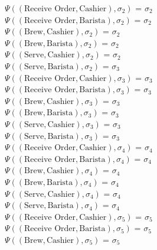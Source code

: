\documentclass[a4paper]{article}
\begin{document}
$\Psi((\text{Receive Order},\text{Cashier}),\sigma_2)$ = $\sigma_2$ \\[0.1\baselineskip] 
$\Psi((\text{Receive Order},\text{Barista}),\sigma_2)$ = $\sigma_2$ \\[0.1\baselineskip] 
$\Psi((\text{Brew},\text{Cashier}),\sigma_2)$ = $\sigma_2$ \\[0.1\baselineskip] 
$\Psi((\text{Brew},\text{Barista}),\sigma_2)$ = $\sigma_2$ \\[0.1\baselineskip] 
$\Psi((\text{Serve},\text{Cashier}),\sigma_2)$ = $\sigma_2$ \\[0.1\baselineskip] 
$\Psi((\text{Serve},\text{Barista}),\sigma_2)$ = $\sigma_3$ \\[0.7\baselineskip] 
$\Psi((\text{Receive Order},\text{Cashier}),\sigma_3)$ = $\sigma_3$ \\[0.1\baselineskip] 
$\Psi((\text{Receive Order},\text{Barista}),\sigma_3)$ = $\sigma_3$ \\[0.1\baselineskip] 
$\Psi((\text{Brew},\text{Cashier}),\sigma_3)$ = $\sigma_3$ \\[0.1\baselineskip] 
$\Psi((\text{Brew},\text{Barista}),\sigma_3)$ = $\sigma_3$ \\[0.1\baselineskip] 
$\Psi((\text{Serve},\text{Cashier}),\sigma_3)$ = $\sigma_3$ \\[0.1\baselineskip] 
$\Psi((\text{Serve},\text{Barista}),\sigma_3)$ = $\sigma_3$ \\[0.7\baselineskip] 
$\Psi((\text{Receive Order},\text{Cashier}),\sigma_4)$ = $\sigma_4$ \\[0.1\baselineskip] 
$\Psi((\text{Receive Order},\text{Barista}),\sigma_4)$ = $\sigma_4$ \\[0.1\baselineskip] 
$\Psi((\text{Brew},\text{Cashier}),\sigma_4)$ = $\sigma_4$ \\[0.1\baselineskip] 
$\Psi((\text{Brew},\text{Barista}),\sigma_4)$ = $\sigma_4$ \\[0.1\baselineskip] 
$\Psi((\text{Serve},\text{Cashier}),\sigma_4)$ = $\sigma_4$ \\[0.1\baselineskip] 
$\Psi((\text{Serve},\text{Barista}),\sigma_4)$ = $\sigma_4$ \\[0.7\baselineskip] 
$\Psi((\text{Receive Order},\text{Cashier}),\sigma_5)$ = $\sigma_5$ \\[0.1\baselineskip] 
$\Psi((\text{Receive Order},\text{Barista}),\sigma_5)$ = $\sigma_5$ \\[0.1\baselineskip] 
$\Psi((\text{Brew},\text{Cashier}),\sigma_5)$ = $\sigma_5$ \\[0.1\baselineskip] 
\end{document}
